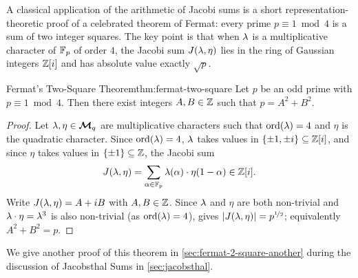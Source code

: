 A classical application of the arithmetic of Jacobi sums is a short representation-theoretic proof of a celebrated theorem of Fermat: every prime $p\equiv 1\bmod 4$ is a sum of two integer squares. The key point is that when $\lambda$ is a multiplicative character of $\mathbb{F}_p$ of order $4$, the Jacobi sum $J(\lambda,\eta)$ lies in the ring of Gaussian integers $\mathbb{Z}[i]$ and has absolute value exactly $\sqrt p$.
\begin{Theorem}{Fermat's Two-Square Theorem}{thm:fermat-two-square}%
  Let $p$ be an odd prime with $p\equiv 1\bmod 4$. Then there exist integers $A,B\in\mathbb{Z}$ such that $p=A^2+B^2$.
\end{Theorem}
\begin{proof}
  Let $\lambda,\eta\in\boldsymbol{\mathcal{M}}_q$ are multiplicative characters such that $\operatorname{ord}(\lambda)=4$ and $\eta$ is the quadratic character. Since $\operatorname{ord}(\lambda)=4$, $\lambda$ takes values in $\{\pm 1,\pm i\}\subseteq \mathbb{Z}[i]$, and since $\eta$ takes values in $\{\pm 1\}\subseteq \mathbb{Z}$, the Jacobi sum $$J(\lambda,\eta)=\sum_{\alpha\in\mathbb{F}_p}\lambda(\alpha)\cdot \eta(1-\alpha)\in\mathbb{Z}[i].$$Write $J(\lambda,\eta)=A+iB$ with $A,B\in\mathbb{Z}$. Since $\lambda$ and $\eta$ are both non-trivial and $\lambda\cdot \eta=\lambda^3$ is also non-trivial (as $\operatorname{ord}(\lambda)=4$),  gives $|J(\lambda,\eta)|=p^{\nicefrac12}$; equivalently $A^2+B^2=p$.
\end{proof}

We give another proof of this theorem in \autoref{sec:fermat-2-square-another} during the discussion of Jacobsthal Sums in \autoref{sec:jacobsthal}. 